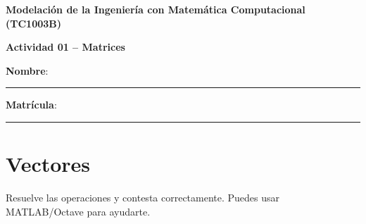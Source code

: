 \documentclass[spanish, 10pt]{article}
\begin{document}
\begin{center}
	{\Large \textbf{Modelación de la Ingeniería con Matemática Computacional (TC1003B)}}
	
	\bigskip
	{\large \textbf{Actividad 01 -- Matrices}}
\end{center}

\bigskip
{\large \textbf{Nombre}: \rule{13.7 cm}{0.4mm}}



\bigskip
{\large \textbf{Matrícula}: \rule{5 cm}{0.4mm}} %

\bigskip


\section{Vectores}

Resuelve las operaciones y contesta correctamente. Puedes usar MATLAB/Octave para ayudarte.

\vspace{3ex}
\end{document}
